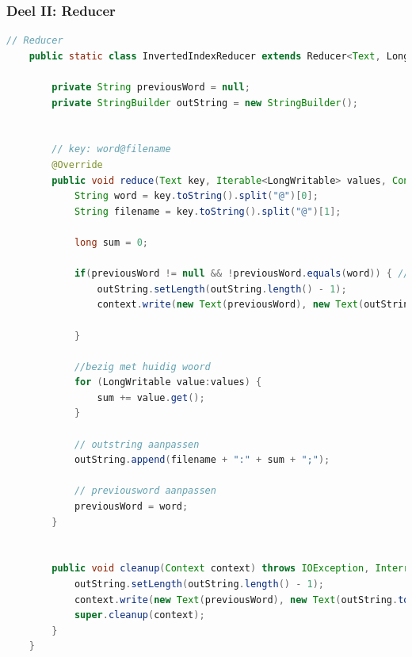 \documentclass[a4paper,10pt,twoside]{report}
\begin{document}
\subsubsection{Deel II: Reducer}
\begin{lstlisting}[language=Java]
	// Reducer
	public static class InvertedIndexReducer extends Reducer<Text, LongWritable, Text, Text>{
		
		private String previousWord = null;
		private StringBuilder outString = new StringBuilder();
		
		
		// key: word@filename
		@Override
		public void reduce(Text key, Iterable<LongWritable> values, Context context) throws IOException, InterruptedException {
			String word = key.toString().split("@")[0];
			String filename = key.toString().split("@")[1];
			
			long sum = 0;
			
			if(previousWord != null && !previousWord.equals(word)) { // nieuw woord gezien
				outString.setLength(outString.length() - 1);
				context.write(new Text(previousWord), new Text(outString.toString()));
				
			}
			
			//bezig met huidig woord
			for (LongWritable value:values) {
				sum += value.get();
			}
			
			// outstring aanpassen
			outString.append(filename + ":" + sum + ";");
			
			// previousword aanpassen
			previousWord = word;
		}
		
		
		public void cleanup(Context context) throws IOException, InterruptedException{
			outString.setLength(outString.length() - 1);
			context.write(new Text(previousWord), new Text(outString.toString()));
			super.cleanup(context);
		}
	}
	
\end{lstlisting}

\newpage
\end{document}
